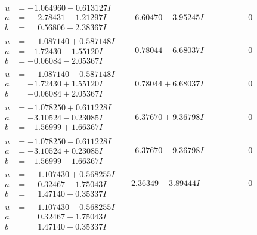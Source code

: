 \documentclass[1p]{elsarticle_modified}
\theoremstyle{definition}
\begin{document}
$$\begin{array}{c|c|c}
\begin{aligned}
u &= -1.064960 - 0.613127 I \\
a &= \phantom{-}2.78431 + 1.21297 I \\
b &= \phantom{-}0.56806 + 2.38367 I\end{aligned}
 & \phantom{-}6.60470 - 3.95245 I & \phantom{-0.000000 } 0 \\ \hline\begin{aligned}
u &= \phantom{-}1.087140 + 0.587148 I \\
a &= -1.72430 - 1.55120 I \\
b &= -0.06084 - 2.05367 I\end{aligned}
 & \phantom{-}0.78044 - 6.68037 I & \phantom{-0.000000 } 0 \\ \hline\begin{aligned}
u &= \phantom{-}1.087140 - 0.587148 I \\
a &= -1.72430 + 1.55120 I \\
b &= -0.06084 + 2.05367 I\end{aligned}
 & \phantom{-}0.78044 + 6.68037 I & \phantom{-0.000000 } 0 \\ \hline\begin{aligned}
u &= -1.078250 + 0.611228 I \\
a &= -3.10524 - 0.23085 I \\
b &= -1.56999 + 1.66367 I\end{aligned}
 & \phantom{-}6.37670 + 9.36798 I & \phantom{-0.000000 } 0 \\ \hline\begin{aligned}
u &= -1.078250 - 0.611228 I \\
a &= -3.10524 + 0.23085 I \\
b &= -1.56999 - 1.66367 I\end{aligned}
 & \phantom{-}6.37670 - 9.36798 I & \phantom{-0.000000 } 0 \\ \hline\begin{aligned}
u &= \phantom{-}1.107430 + 0.568255 I \\
a &= \phantom{-}0.32467 - 1.75043 I \\
b &= \phantom{-}1.47140 - 0.35337 I\end{aligned}
 & -2.36349 - 3.89444 I & \phantom{-0.000000 } 0 \\ \hline\begin{aligned}
u &= \phantom{-}1.107430 - 0.568255 I \\
a &= \phantom{-}0.32467 + 1.75043 I \\
b &= \phantom{-}1.47140 + 0.35337 I\end{aligned}

\end{array}$$
\end{document}
